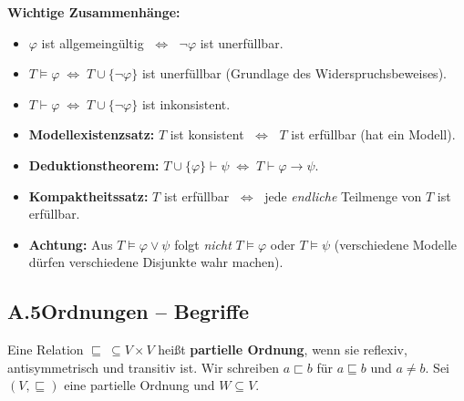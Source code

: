 \medskip
\noindent\textbf{Wichtige Zusammenhänge:}
\begin{itemize}\itemsep2pt
  \item $\varphi$ ist allgemeingültig $\;\Longleftrightarrow\;$ $\neg\varphi$ ist unerfüllbar.
  \item $T\models\varphi \;\Longleftrightarrow\; T\cup\{\neg\varphi\}$ ist unerfüllbar \quad(Grundlage des Widerspruchsbeweises).
  \item $T\vdash\varphi \;\Longleftrightarrow\; T\cup\{\neg\varphi\}$ ist inkonsistent.
  \item \textbf{Modellexistenzsatz:} $T$ ist konsistent $\;\Longleftrightarrow\;$ $T$ ist erfüllbar (hat ein Modell).
  \item \textbf{Deduktionstheorem:} $T\cup\{\varphi\}\vdash\psi \;\Longleftrightarrow\; T\vdash\varphi\to\psi$.
  \item \textbf{Kompaktheitssatz:} $T$ ist erfüllbar $\;\Longleftrightarrow\;$ jede \emph{endliche} Teilmenge von $T$ ist erfüllbar.
  \item \textbf{Achtung:} Aus $T\models\varphi\vee\psi$ folgt \emph{nicht} $T\models\varphi$ oder $T\models\psi$ (verschiedene Modelle dürfen verschiedene Disjunkte wahr machen).
\end{itemize}

\newpage
\subsection*{A.5\quad Ordnungen -- Begriffe}

Eine Relation $\sqsubseteq\ \subseteq V\times V$ heißt \textbf{partielle Ordnung}, wenn sie reflexiv, antisymmetrisch und transitiv ist. Wir schreiben $a\sqsubset b$ für $a\sqsubseteq b$ und $a\neq b$. Sei $(V,\sqsubseteq)$ eine partielle Ordnung und $W\subseteq V$.

